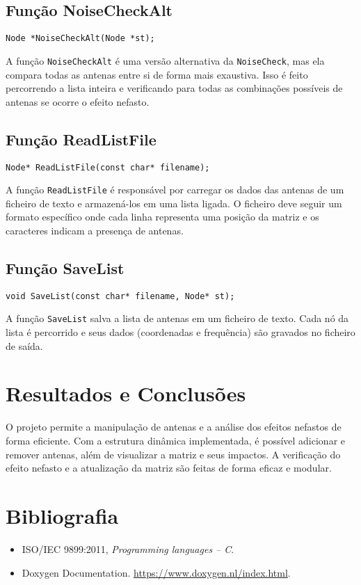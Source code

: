 \documentclass[a4paper,12pt]{article}
\begin{document}
\subsection{Função NoiseCheckAlt}
\begin{lstlisting}[style=CStyle]
Node *NoiseCheckAlt(Node *st);
\end{lstlisting}

A função \texttt{NoiseCheckAlt} é uma versão alternativa da \texttt{NoiseCheck}, mas ela compara todas as antenas entre si de forma mais exaustiva. Isso é feito percorrendo a lista inteira e verificando para todas as combinações possíveis de antenas se ocorre o efeito nefasto.

\subsection{Função ReadListFile}
\begin{lstlisting}[style=CStyle]
Node* ReadListFile(const char* filename);
\end{lstlisting}

A função \texttt{ReadListFile} é responsável por carregar os dados das antenas de um ficheiro de texto e armazená-los em uma lista ligada. O ficheiro deve seguir um formato específico onde cada linha representa uma posição da matriz e os caracteres indicam a presença de antenas.

\subsection{Função SaveList}
\begin{lstlisting}[style=CStyle]
void SaveList(const char* filename, Node* st);
\end{lstlisting}

A função \texttt{SaveList} salva a lista de antenas em um ficheiro de texto. Cada nó da lista é percorrido e seus dados (coordenadas e frequência) são gravados no ficheiro de saída.

\newpage

\section{Resultados e Conclusões}
O projeto permite a manipulação de antenas e a análise dos efeitos nefastos de forma eficiente. Com a estrutura dinâmica implementada, é possível adicionar e remover antenas, além de visualizar a matriz e seus impactos. A verificação do efeito nefasto e a atualização da matriz são feitas de forma eficaz e modular.

\newpage

\section{Bibliografia}
\begin{itemize}
    \item ISO/IEC 9899:2011, \textit{Programming languages – C}.
    \item Doxygen Documentation. \url{https://www.doxygen.nl/index.html}.
\end{itemize}
\end{document}
